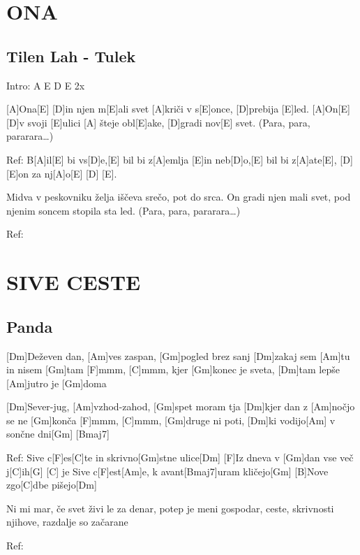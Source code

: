 \documentclass{article}
\begin{document}
\section*{ONA}
%
\subsection*{Tilen Lah - Tulek}
\begin{guitar}
	Intro: A E D E 2x

	[A]Ona[E] [D]in njen m[E]ali svet
	[A]kriči v s[E]once, [D]prebija [E]led.
	[A]On[E] [D]v svoji [E]ulici
	[A] šteje obl[E]ake, [D]gradi nov[E] svet.
	(Para, para, pararara…)
	\linebreak

	Ref:
	B[A]il[E] bi vs[D]e,[E] bil bi z[A]emlja [E]in neb[D]o,[E]
	bil bi z[A]ate[E], [D] [E]on za nj[A]o[E] [D] [E].
	\linebreak

	Midva v peskovniku želja
	iščeva srečo, pot do srca.
	On gradi njen mali svet,
	pod njenim soncem stopila sta led.
	(Para, para, pararara…)
	\linebreak

	Ref:

\end{guitar}


\section*{SIVE CESTE}
%
\subsection*{Panda}
\begin{guitar}

	[Dm]Deževen dan, [Am]ves zaspan, [Gm]pogled brez sanj
	[Dm]zakaj sem [Am]tu in nisem [Gm]tam
	[F]mmm, [C]mmm, kjer [Gm]konec je sveta,
	[Dm]tam lepše [Am]jutro je [Gm]doma
	\linebreak

	[Dm]Sever-jug, [Am]vzhod-zahod, [Gm]spet moram tja
	[Dm]kjer dan z [Am]nočjo se ne [Gm]konča
	[F]mmm, [C]mmm, [Gm]druge ni poti,
	[Dm]ki vodijo[Am] v sončne dni[Gm] [Bmaj7]
	\linebreak

	Ref:
	Sive c[F]es[C]te in skrivno[Gm]stne ulice[Dm]
	[F]Iz dneva v [Gm]dan vse več j[C]ih[G] [C] je
	Sive c[F]est[Am]e, k avant[Bmaj7]uram kličejo[Gm]
	[B]Nove zgo[C]dbe pišejo[Dm]
	\linebreak

	Ni mi mar, če svet živi le za denar,
	potep je meni gospodar,
	ceste, skrivnosti njihove,
	razdalje so začarane
	\linebreak

	Ref:

\end{guitar}
\end{document}
